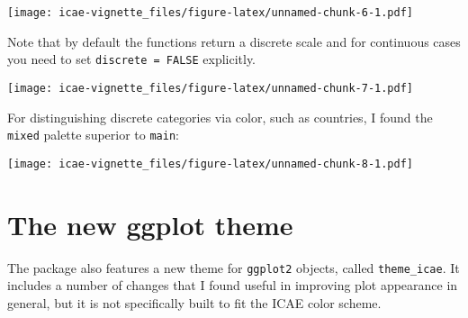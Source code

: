 \documentclass[]{article}
\newenvironment{Shaded}{\begin{snugshade}}{\end{snugshade}}
\newcommand{\KeywordTok}[1]{\textcolor[rgb]{0.13,0.29,0.53}{\textbf{#1}}}
\newcommand{\DataTypeTok}[1]{\textcolor[rgb]{0.13,0.29,0.53}{#1}}
\newcommand{\StringTok}[1]{\textcolor[rgb]{0.31,0.60,0.02}{#1}}
\newcommand{\OperatorTok}[1]{\textcolor[rgb]{0.81,0.36,0.00}{\textbf{#1}}}
\newcommand{\NormalTok}[1]{#1}
\begin{document}
\texttt{[image: icae-vignette\_files/figure-latex/unnamed-chunk-6-1.pdf]}

Note that by default the functions return a discrete scale and for
continuous cases you need to set \texttt{discrete\ =\ FALSE} explicitly.

\begin{Shaded}
\end{Shaded}

\texttt{[image: icae-vignette\_files/figure-latex/unnamed-chunk-7-1.pdf]}

For distinguishing discrete categories via color, such as countries, I
found the \texttt{mixed} palette superior to \texttt{main}:

\begin{Shaded}
\end{Shaded}

\texttt{[image: icae-vignette\_files/figure-latex/unnamed-chunk-8-1.pdf]}

\section{The new ggplot theme}\label{the-new-ggplot-theme}

The package also features a new theme for \texttt{ggplot2} objects,
called \texttt{theme\_icae}. It includes a number of changes that I
found useful in improving plot appearance in general, but it is not
specifically built to fit the ICAE color scheme.
\end{document}
